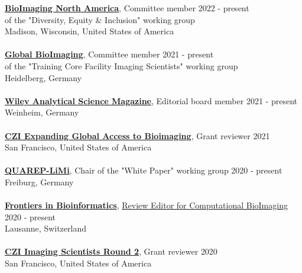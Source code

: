 \documentclass[margin,line]{res}
\begin{document}
\begin{resume}
{\bf \href{https://www.bioimagingna.org/}{BioImaging North America}}, Committee member \hfill {2022 - present}\\
of the "Diversity, Equity \& Inclusion" working group\\
Madison, Wisconsin, United States of America\\
\vspace*{-3mm}\\
{\bf \href{https://globalbioimaging.org/working-groups}{Global BioImaging}}, Committee member \hfill {2021 - present}\\
of the "Training Core Facility Imaging Scientists" working group\\
Heidelberg, Germany\\
\vspace*{-3mm}\\
{\bf \href{https://analyticalscience.wiley.com/}{Wiley Analytical Science Magazine}}, Editorial board member  \hfill {2021 - present}\\
Weinheim, Germany \\
\vspace*{-3mm}\\
{\bf \href{https://chanzuckerberg.com/rfa/expanding-global-access-bioimaging/}{CZI Expanding Global Access to Bioimaging}}, Grant reviewer \hfill {2021}\\
San Francisco, United States of America\\
\vspace*{-3mm}\\
{\bf \href{https://quarep.org/}{QUAREP-LiMi}}, Chair of the "White Paper" working group \hfill {2020 - present}\\
Freiburg, Germany\\
\vspace*{-3mm}\\
{\bf  \href{https://www.frontiersin.org/journals/bioinformatics/sections/computational-bioimaging}{ Frontiers in Bioinformatics}},  \href{https://www.frontiersin.org/journals/bioinformatics/sections/computational-bioimaging}{Review Editor for Computational BioImaging} \hfill {2020 - present}\\
Lausanne, Switzerland\\
\vspace*{-3mm}\\
{\bf \href{https://chanzuckerberg.com/rfa/chan-zuckerberg-initiative-imaging-scientists/}{CZI Imaging Scientists Round 2}}, Grant reviewer \hfill {2020}\\
San Francisco, United States of America\\

\end{resume}
\end{document}
